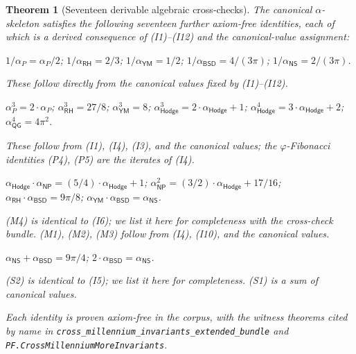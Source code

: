 \documentclass[11pt,a4paper]{amsart}
\theoremstyle{plain}
\newtheorem{theorem}{Theorem}[section]
\theoremstyle{definition}
\begin{document}
\begin{theorem}[Seventeen derivable algebraic cross-checks]\label{thm:cross-checks}
The canonical $\alpha$-skeleton satisfies the following seventeen further axiom-free identities, each of which is a derived consequence of (I1)--(I12) and the canonical-value assignment:
\begin{description}[itemsep=2pt,font=\normalfont\bfseries,leftmargin=2em]
\item[Reciprocals (R1)--(R5).]
$1/\alpha_{P} = \alpha_{P}/2$;\quad
$1/\alpha_{\textsf{RH}} = 2/3$;\quad
$1/\alpha_{\textsf{YM}} = 1/2$;\quad
$1/\alpha_{\textsf{BSD}} = 4/(3\pi)$;\quad
$1/\alpha_{\textsf{NS}} = 2/(3\pi)$.

These follow directly from the canonical values fixed by (I1)--(I12).

\item[Higher powers (P1)--(P6).]
$\alpha_{P}^{3} = 2\cdot\alpha_{P}$;\quad
$\alpha_{\textsf{RH}}^{3} = 27/8$;\quad
$\alpha_{\textsf{YM}}^{3} = 8$;\quad
$\alpha_{\textsf{Hodge}}^{3} = 2\cdot\alpha_{\textsf{Hodge}} + 1$;\quad
$\alpha_{\textsf{Hodge}}^{4} = 3\cdot\alpha_{\textsf{Hodge}} + 2$;\quad
$\alpha_{\textsf{QG}}^{4} = 4\pi^{2}$.

These follow from (I1), (I4), (I3), and the canonical values; the $\varphi$-Fibonacci identities (P4), (P5) are the iterates of (I4).

\item[Mixed products (M1)--(M4).]
$\alpha_{\textsf{Hodge}}\cdot\alpha_{\textsf{NP}} = (5/4)\cdot\alpha_{\textsf{Hodge}} + 1$;\quad
$\alpha_{\textsf{NP}}^{2} = (3/2)\cdot\alpha_{\textsf{Hodge}} + 17/16$;\quad
$\alpha_{\textsf{RH}}\cdot\alpha_{\textsf{BSD}} = 9\pi/8$;\quad
$\alpha_{\textsf{YM}}\cdot\alpha_{\textsf{BSD}} = \alpha_{\textsf{NS}}$.

(M4) is identical to (I6); we list it here for completeness with the cross-check bundle. (M1), (M2), (M3) follow from (I4), (I10), and the canonical values.

\item[Sums (S1)--(S2).]
$\alpha_{\textsf{NS}} + \alpha_{\textsf{BSD}} = 9\pi/4$;\quad
$2\cdot\alpha_{\textsf{BSD}} = \alpha_{\textsf{NS}}$.

(S2) is identical to (I5); we list it here for completeness. (S1) is a sum of canonical values.
\end{description}
Each identity is proven axiom-free in the corpus, with the witness theorems cited by name in \texttt{cross\_millennium\_invariants\_extended\_bundle} and \texttt{PF.CrossMillenniumMoreInvariants}.
\end{theorem}
\end{document}

